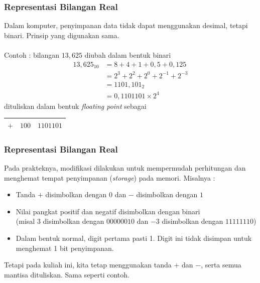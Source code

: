 \documentclass{beamer}
\begin{document}
\begin{frame}
\frametitle{Representasi Bilangan Real}
Dalam komputer, penyimpanan data tidak dapat menggunakan desimal, tetapi binari. Prinsip yang digunakan sama. 
\\\ \\Contoh : bilangan $13,625$ diubah dalam bentuk binari
\begin{equation}
\begin{split}
13,625_{10} &=8+4+1+0,5+0,125 
\\&=2^3+2^2+2^0 + 2^{-1}+2^{-3}
\\&=1101,101_{2}
\\&=0,1101101 \times 2^{4}
\end{split}
\nonumber
\end{equation}
dituliskan dalam bentuk \textit{floating point} sebagai
\begin{center}
\begin{tabular}{|c|c|c|}
\hline
	$+$ & $100$ & $1101101$\\
\hline
\end{tabular}
\end{center}
\end{frame}

\begin{frame}
\frametitle{Representasi Bilangan Real}
Pada prakteknya, modifikasi dilakukan untuk mempermudah perhitungan dan menghemat tempat penyimpanan (\textit{storage}) pada memori. Misalnya :
\begin{itemize}
\item Tanda $+$ disimbolkan dengan 0 dan $-$ disimbolkan dengan $1$ 
\item Nilai pangkat positif dan negatif disimbolkan dengan binari \\(misal $3$ disimbolkan dengan $00000010$ dan $-3$ disimbolkan dengan $11111110$)
\item Dalam bentuk normal, digit pertama pasti 1. Digit ini tidak disimpan untuk menghemat 1 bit penyimpanan.
\end{itemize}
Tetapi pada kuliah ini, kita tetap menggunakan tanda $+$ dan $-$, serta semua mantisa dituliskan. Sama seperti contoh.
\end{frame}
\end{document}
